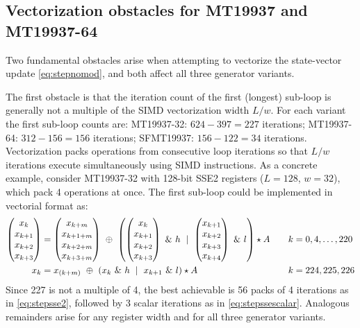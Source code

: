 \documentclass[preprint,1p,times]{elsarticle}
\begin{document}
\subsection{Vectorization obstacles for MT19937 and MT19937-64}
\label{sec:vectorization}
Two fundamental obstacles arise when attempting to vectorize the state-vector update \eqref{eq:stepnomod}, and both affect all three generator variants.

The first obstacle is that the iteration count of the first (longest) sub-loop is generally not a multiple of the SIMD vectorization width $L/w$. For each variant the first sub-loop counts are: MT19937-32: $624-397=227$ iterations; MT19937-64: $312-156=156$ iterations; SFMT19937: $156-122=34$ iterations. Vectorization packs operations from consecutive loop iterations so that $L/w$ iterations execute simultaneously using SIMD instructions. As a concrete example, consider MT19937-32 with 128-bit SSE2 registers ($L=128$, $w=32$), which pack 4 operations at once. The first sub-loop could be implemented in vectorial format as:
\begin{align}
\label{eq:stepsse2}
\begin{pmatrix}x_{k} \\ x_{k+1} \\ x_{k+2} \\ x_{k+3} \end{pmatrix}
&= \begin{pmatrix}x_{k+m} \\ x_{k+1+m} \\ x_{k+2+m} \\ x_{k+3+m} \end{pmatrix} ~\mathbin{\oplus}~ \left(\begin{pmatrix}x_{k} \\ x_{k+1} \\ x_{k+2} \\ x_{k+3} \end{pmatrix}~\&~h ~\mid~ \begin{pmatrix}x_{k+1} \\ x_{k+2} \\ x_{k+3} \\ x_{k+4} \end{pmatrix}~\&~l\right) \star A \quad && k=0, 4, \dots, 220 \\
\label{eq:stepssescalar}
x_k &= x_{(k+m)} ~\mathbin{\oplus}~ \left(x_{k}~\&~h ~\mid~ x_{k+1}~\&~l\right) \star A \quad &&k = 224, 225, 226
\end{align}
Since 227 is not a multiple of 4, the best achievable is 56 packs of 4 iterations as in \eqref{eq:stepsse2}, followed by 3 scalar iterations as in \eqref{eq:stepssescalar}. Analogous remainders arise for any register width and for all three generator variants.
\end{document}
